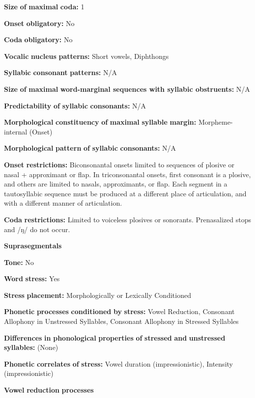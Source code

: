 \begin{styleBody}
\textbf{Size} \textbf{of} \textbf{maximal} \textbf{coda:} 1

\textbf{Onset} \textbf{obligatory:} No

\textbf{Coda} \textbf{obligatory:} No

\textbf{Vocalic} \textbf{nucleus} \textbf{patterns:} Short vowels, Diphthongs

\textbf{Syllabic} \textbf{consonant} \textbf{patterns:} N/A

\textbf{Size} \textbf{of} \textbf{maximal} \textbf{word{}-marginal sequences with syllabic obstruents:} N/A

\textbf{Predictability} \textbf{of} \textbf{syllabic} \textbf{consonants:} N/A 

\textbf{Morphological} \textbf{constituency} \textbf{of} \textbf{maximal} \textbf{syllable} \textbf{margin:} Morpheme-internal (Onset)

\textbf{Morphological} \textbf{pattern} \textbf{of} \textbf{syllabic} \textbf{consonants:} N/A

\textbf{Onset} \textbf{restrictions:} Biconsonantal onsets limited to sequences of plosive or nasal + approximant or flap. In triconsonantal onsets, first consonant is a plosive, and others are limited to nasals, approximants, or flap. Each segment in a tautosyllabic sequence must be produced at a different place of articulation, and with a different manner of articulation.

\textbf{Coda} \textbf{restrictions:} Limited to voiceless plosives or sonorants. Prenasalized stops and /ŋ/ do not occur.

\textbf{Suprasegmentals}

\textbf{Tone:} No

\textbf{Word} \textbf{stress:} Yes

\textbf{Stress} \textbf{placement:} Morphologically or Lexically Conditioned

\textbf{Phonetic} \textbf{processes} \textbf{conditioned} \textbf{by} \textbf{stress:} Vowel Reduction, Consonant Allophony in Unstressed Syllables, Consonant Allophony in Stressed Syllables

\textbf{Differences} \textbf{in} \textbf{phonological} \textbf{properties} \textbf{of} \textbf{stressed} \textbf{and} \textbf{unstressed} \textbf{syllables:} (None)

\textbf{Phonetic} \textbf{correlates} \textbf{of} \textbf{stress:} Vowel duration (impressionistic), Intensity (impressionistic)

\textbf{Vowel} \textbf{reduction} \textbf{processes}


\end{styleBody}
